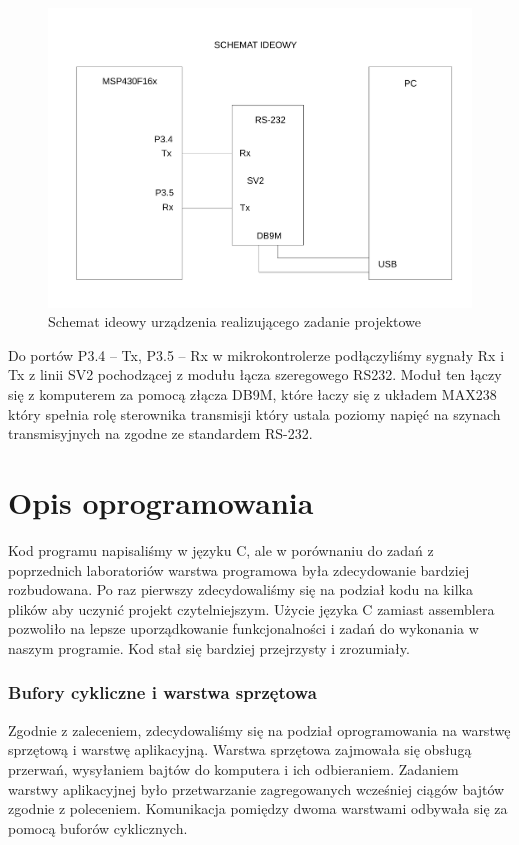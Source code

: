 \documentclass[a4paper,titlepage,11pt,floatssmall]{mwrep}
\begin{document}
\begin{figure}[H]
\centering
\includegraphics[width=\textwidth]{img/Ideowy.pdf}
\caption{Schemat ideowy urządzenia realizującego zadanie projektowe}
\end{figure}

Do portów P3.4 – Tx, P3.5 – Rx w mikrokontrolerze podłączyliśmy sygnały Rx i Tx z linii SV2 pochodzącej z modułu łącza szeregowego RS232. Moduł ten łączy się z komputerem za pomocą złącza DB9M, które łaczy się z układem MAX238 który spełnia rolę sterownika transmisji który ustala poziomy napięć na szynach transmisyjnych na zgodne ze standardem RS-232.

\newpage
\section{Opis oprogramowania}
Kod programu napisaliśmy w języku C, ale w porównaniu do zadań z poprzednich laboratoriów warstwa programowa była zdecydowanie bardziej rozbudowana. Po raz pierwszy zdecydowaliśmy się na podział kodu na kilka plików aby uczynić projekt czytelniejszym. Użycie języka C zamiast assemblera pozwoliło na lepsze uporządkowanie funkcjonalności i zadań do wykonania w naszym programie. Kod stał się bardziej przejrzysty i zrozumiały.\\

\subsubsection{Bufory cykliczne i warstwa sprzętowa}
\indent{}Zgodnie z zaleceniem, zdecydowaliśmy się na podział oprogramowania na warstwę sprzętową i warstwę aplikacyjną. Warstwa sprzętowa zajmowała się obsługą przerwań, wysyłaniem bajtów do komputera i ich odbieraniem. Zadaniem warstwy aplikacyjnej było przetwarzanie zagregowanych wcześniej ciągów bajtów zgodnie z poleceniem. Komunikacja pomiędzy dwoma warstwami odbywała się za pomocą buforów cyklicznych. 
\end{document}
